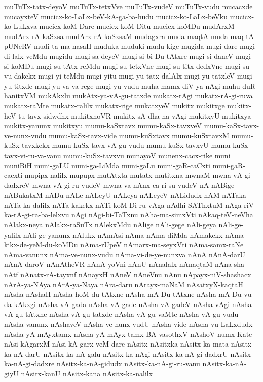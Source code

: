 {muTuTx-tatx-deyoV
muTuTx-tetxVve
muTuTx-vudeV
muTuTx-vudu
mucacxde
mucayxteV
mucicx-ko-LaLx-beV-kA-ga-ba-hudu
mucicx-ko-LaLx-beVku
mucicx-ko-LuLxva
mucicx-koM-Dare
mucicx-koM-Ditu
mucicx-koMDu
mudArxM
mudArx-rA-kaSxsa
mudArx-rA-kaSxsaM
mudagxra
muda-maqtA
muda-maq-tA-pUNeRV
mudi-ta-ma-nasaH
muduka
muduki
mudu-kige
mugida
mugi-dare
mugi-di-lalx-veMdu
mugidu
mugi-sa-deyeV
mugi-si-bi-Du-tAtxre
mugi-si-daneV
mugi-si-koMDu
mugi-su-tAtx-reMdu
mugi-su-tetxVne
mugi-su-titx-dedxVne
mugi-su-vu-dakekx
mugi-yi-teMdu
mugi-yitu
mugi-yu-tatx-dalAlx
mugi-yu-tatxleV
mugi-yu-titxde
mugi-yu-va-va-rege
mugi-yu-vudu
muha-mamx-diV-ya-nAgi
muhu-duR-hanitxVM
mukAkxlu
mukAtx-ya-vA-gu-tatxde
mukatx-rAgi
mukatx-rA-gi-ruva
mukatx-raMte
mukatx-ralilx
mukatx-rige
mukatxyeV
mukitx
mukitxge
mukitx-heV-tu-tavx-sidwdhx
mukitxnoVR
mukitx-sA-dha-na-vAgi
mukitxyU
mukitxya
mukitx-yanunx
mukitxyu
mumu-kaSxtavx
mumu-kaSx-tavxveV
mumu-kaSx-tavx-ve-nunx-vudu
mumu-kaSx-tavx-vide
mumu-kuSxtavx
mumu-kuSxtavxM
mumu-kuSx-tavxkekx
mumu-kuSx-tavx-vA-gu-vudu
mumu-kuSx-tavxvU
mumu-kuSx-tavx-vi-ru-va-vanu
mumu-kuSx-tavxvu
munayoV
munenx-cacx-rike
muni
muniBiH
muni-gaLU
muni-ga-LiMda
muni-gaLu
muni-gaR-caCxti
muni-gaR-cacxti
mupipx-nalilx
mupupx
mutAtxta
mutatx
mutitxna
mwnaM
mwna-vA-gi-dadxreV
mwna-vA-gi-ru-vudeV
mwna-va-nAnx-ca-ri-su-vudeV
nA
nABige
nABukatxM
nADu
nALe
nALeyU
nALeya
nALeyeV
nALidudx
nAM
nATaka
nATa-ka-dalilx
nATa-kakekx
nATi-koM-Di-ru-vAga
nAdhi-SAThxtuM
nAga-riV-ka-rA-gi-ra-ba-lelxvu
nAgi
nAgi-bi-TaTxnu
nAha-ma-simxVti
nAkaq-teV-neVha
nAlakx-neya
nAlakx-raSuTx
nAlekxMdu
nAlige
nAli-gege
nAli-geya
nAli-ge-yalilx
nAli-ge-yanunx
nAlukx
nAmAsi
nAma
nAma-diMda
nAmakekx
nAma-kikx-de-yeM-du-koMDu
nAma-rUpeV
nAmarx-ma-seyxVti
nAma-samx-raNe
nAma-vanunx
nAma-ve-nunx-vudu
nAma-vi-de-ye-nunxva
nAnA
nAnA-darU
nAnA-daroV
nAnAtheVR
nAnA-yoVni
nAnU
nAnalalx
nAnaqtaM
nAna-sha-nAtf
nAnatx-rA-tayxnf
nAnayxH
nAneV
nAneVnu
nAnu
nApayx-niV-shashacx
nArA-ya-NAya
nArA-ya-Naya
nAra-daru
nArayx-maNaM
nAsatxyX-kaqtaH
nAsha
nAshaH
nAsha-hoM-du-tAtxne
nAsha-mA-Du-tAtxne
nAsha-mA-Du-vu-da-kAkxgi
nAsha-vA-gada
nAsha-vA-gade
nAsha-vA-gadeV
nAsha-vAgi
nAsha-vA-gu-tAtxne
nAsha-vA-gu-tatxde
nAsha-vA-gu-vaMte
nAsha-vA-gu-vudu
nAsha-vanunx
nAshaveV
nAsha-ve-nunx-vudU
nAsha-vide
nAsha-vu-LaLxdudx
nAsha-yA-mAyxtamx
nAsha-yA-mAyx-tamx-BA-vasothxV
nAshoV-numx-Kate
nAsi-kAgarxM
nAsi-kA-garx-veM-dare
nAsitx
nAsitxka
nAsitx-ka-mata
nAsitx-ka-nA-darU
nAsitx-ka-nA-galu
nAsitx-ka-nAgi
nAsitx-ka-nA-gi-dadxrU
nAsitx-ka-nA-gi-dadxre
nAsitx-ka-nA-gidudx
nAsitx-ka-nA-gi-ru-vanu
nAsitx-ka-nA-giyU
nAsitx-kanU
nAsitx-kana
nAsitx-ka-nalilx
}
